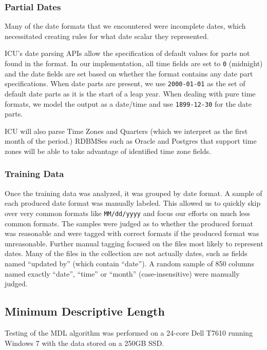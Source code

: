\subsubsection{Partial Dates}
Many of the date formats that we encountered were incomplete dates, which necessitated creating rules for what date scalar they represented.

ICU's date parsing APIs allow the specification of default values for parts not found in the format. In our implementation, all time fields are set to \texttt{0} (midnight) and the date fields are set based on whether the format contains any date part specifications. When date parts are present, we use \texttt{2000-01-01} as the set of default date parts as it is the start of a leap year. When dealing with pure time formats, we model the output as a date/time and use \texttt{1899-12-30} for the date parts.

ICU will also parse Time Zones and Quarters (which we interpret as the first month of the period.) RDBMSes such as Oracle and Postgres that support time zones will be able to take advantage of  identified time zone fields.

\subsubsection{Training Data}

Once the training data was analyzed, it was grouped by date format. A sample of each produced date format was manually labeled. This allowed us to quickly skip over very common formats like \texttt{MM/dd/yyyy} and focus our efforts on much less common formats. The samples were judged as to whether the produced format was reasonable and were tagged with correct formats if the produced format was unreasonable.
Further manual tagging focused on the files most likely to represent dates. Many of the files in the collection are not actually dates, such as fields named ``updated by'' (which contain ``date''). A random sample of 850 columns named exactly ``date'', ``time'' or ``month'' (case-insensitive) were manually judged.

\subsection{Minimum Descriptive Length}
Testing of the MDL algorithm was performed on a 24-core Dell T7610 running Windows 7 with the data stored on a 250GB SSD.

